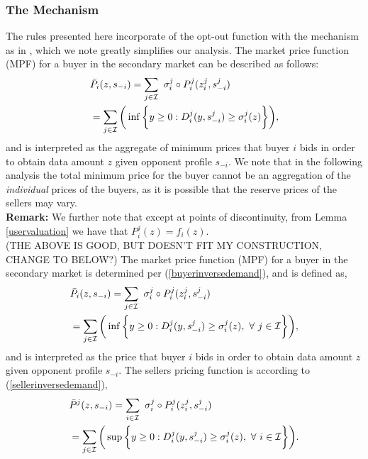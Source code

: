 \subsubsection{The Mechanism}\label{datamechanism}
The rules presented here incorporate of the opt-out function with the
mechanism as in \cite{lazar}, which we note greatly simplifies our
analysis. 
The market price function (MPF) for a buyer in the secondary market
can be described as follows:
\begin{align}\label{dataprice}
\begin{split}
    &\bar{P}_i(z, s_{-i}) =\displaystyle\sum_{j\in\mathcal{I}} \ \sigma_i^j \circ P_i^j(z_i^j,
s_{-i}^j) \\
    &= \sum_{j\in\mathcal{I}}\bigg(\inf\bigg\lbrace y\ge 0 : 
    {D_i^j}(y,s_{-i}^j) \ge \sigma_i^j(z) \bigg\rbrace \bigg),\\
\end{split}
\end{align}
and is interpreted as the aggregate of minimum prices that buyer $i$ bids in
order to obtain
data amount $z$ given opponent profile $s_{-i}$. We note that in the following
analysis
the total minimum price for the buyer cannot be an aggregation of the
\emph{individual} prices of the buyers, as it is possible that the reserve prices
of the sellers may vary.\\
\textbf{Remark:} We further note that except at points of discontinuity, from
Lemma \ref{uservaluation} we have that $P_i^j(z) = f_i(z)$. \\
\iffalse
(THE ABOVE IS GOOD, BUT DOESN'T FIT MY CONSTRUCTION, CHANGE TO BELOW?)
The market price function (MPF) for a buyer in the secondary market
is determined per (\ref{buyerinversedemand}), and is defined as,
\begin{align}\label{dataprice}
\begin{split}
    &\bar{P}_i(z, s_{-i}) =\displaystyle\sum_{j\in\mathcal{I}} \ \sigma_i^j \circ P_i^j(z_i^j,
s_{-i}^j) \\
    &= \sum_{j\in\mathcal{I}}\bigg(\inf\bigg\lbrace y\ge 0 : 
    {D_i^j}(y,s_{-i}^j) \ge \sigma_i^j(z), \ \forall \ j\in\mathcal{I} \bigg\rbrace \bigg),\\
\end{split}
\end{align}
and is interpreted as the price that buyer $i$ bids in
order to obtain
data amount $z$ given opponent profile $s_{-i}$.
The sellers pricing function is according to (\ref{sellerinversedemand}), 
\begin{align}\label{dataprice}
\begin{split}
    &\bar{P}^j(z, s_{-i}) =\displaystyle\sum_{i\in\mathcal{I}} \ \sigma_i^j \circ P_i^j(z_i^j,
s_{-i}^j) \\
    &= \sum_{j\in\mathcal{I}}\bigg(\sup\bigg\lbrace y\ge 0 : 
    {D_i^j}(y,s_{-i}^j) \ge \sigma_i^j(z), \ \forall \ i\in\mathcal{I} \bigg\rbrace \bigg).\\
\end{split}
\end{align}
